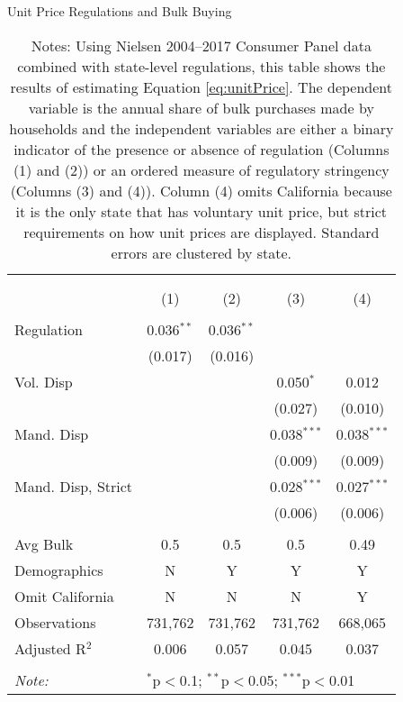 \begin{table}[!htbp] \centering
  \caption{Unit Price Regulations and Bulk Buying}
  \label{tab:unitPriceLaw}
\begin{tabular}{@{\extracolsep{5pt}}lcccc}
\\[-1.8ex]\hline
\hline \\[-1.8ex]
\\[-1.8ex] & (1) & (2) & (3) & (4)\\
\hline \\[-1.8ex]
 Regulation & 0.036$^{**}$ & 0.036$^{**}$ &  &  \\
  & (0.017) & (0.016) &  &  \\
  Vol. Disp &  &  & 0.050$^{*}$ & 0.012 \\
  &  &  & (0.027) & (0.010) \\
  Mand. Disp &  &  & 0.038$^{***}$ & 0.038$^{***}$ \\
  &  &  & (0.009) & (0.009) \\
  Mand. Disp, Strict &  &  & 0.028$^{***}$ & 0.027$^{***}$ \\
  &  &  & (0.006) & (0.006) \\
 \hline \\[-1.8ex]
Avg Bulk & 0.5 & 0.5 & 0.5 & 0.49 \\
Demographics & N & Y & Y & Y \\
Omit California & N & N & N & Y \\
Observations & 731,762 & 731,762 & 731,762 & 668,065 \\
Adjusted R$^{2}$ & 0.006 & 0.057 & 0.045 & 0.037 \\
\hline
\hline \\[-1.8ex]
\textit{Note:}  & \multicolumn{4}{l}{$^{*}$p$<$0.1; $^{**}$p$<$0.05; $^{***}$p$<$0.01} \\
\end{tabular}
\caption*{Notes: Using Nielsen 2004--2017 Consumer Panel data combined with state-level regulations, this table shows the results of estimating Equation \ref{eq:unitPrice}. The dependent variable is the annual share of bulk purchases made by households and the independent variables are either a binary indicator of the presence or absence of regulation (Columns (1) and (2)) or an ordered measure of regulatory stringency (Columns (3) and (4)). Column (4) omits California because it is the only state that has voluntary unit price, but strict requirements on how unit prices are displayed. Standard errors are clustered by state.}
\end{table}
